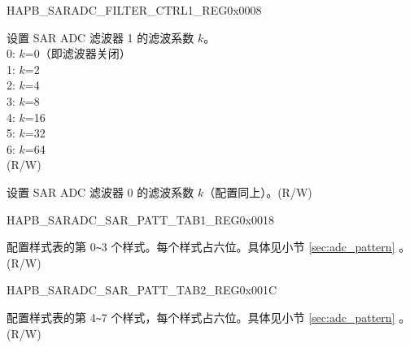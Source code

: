 \begin{register}{H}{APB\_SARADC\_FILTER\_CTRL1\_REG}{0x0008}\label{regdesc:APBSARADCFILTERCTRL1REG}
%
%
%
\regnewline%
\begin{regdesc}\begin{reglist}
\label{fielddesc:APBSARADCFILTERFACTOR1}\item [APB\_SARADC\_FILTER\_FACTOR1] 设置 SAR ADC 滤波器 1 的滤波系数 \(k\)。\\
0: \(k\)=0（即滤波器关闭）\\
1: \(k\)=2\\
2: \(k\)=4\\
3: \(k\)=8\\
4: \(k\)=16\\
5: \(k\)=32\\
6: \(k\)=64\\
(R/W)
\label{fielddesc:APBSARADCFILTERFACTOR0}\item [APB\_SARADC\_FILTER\_FACTOR0] 设置 SAR ADC 滤波器 0 的滤波系数 \(k\)（配置同上）。(R/W)

\end{reglist}\end{regdesc}
\end{register}


\begin{register}{H}{APB\_SARADC\_SAR\_PATT\_TAB1\_REG}{0x0018}\label{regdesc:APBSARADCSARPATTTAB1REG}
%
%
\regnewline%
\begin{regdesc}\begin{reglist}
\label{fielddesc:APBSARADCSARPATTTAB1}\item [APB\_SARADC\_SAR\_PATT\_TAB1] 配置样式表的第 0\verb+~+3 个样式。每个样式占六位。具体见小节 \ref{sec:adc_pattern} \textit{}。 (R/W)
\end{reglist}\end{regdesc}
\end{register}


\begin{register}{H}{APB\_SARADC\_SAR\_PATT\_TAB2\_REG}{0x001C}\label{regdesc:APBSARADCSARPATTTAB2REG}
%
%
\regnewline%
\begin{regdesc}\begin{reglist}
\label{fielddesc:APBSARADCSARPATTTAB2}\item [APB\_SARADC\_SAR\_PATT\_TAB2] 配置样式表的第 4\verb+~+7 个样式，每个样式占六位。具体见小节 \ref{sec:adc_pattern} \textit{}。(R/W)
\end{reglist}\end{regdesc}
\end{register}


